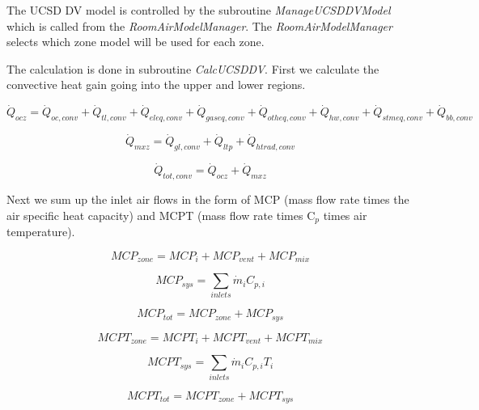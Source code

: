 The UCSD DV model is controlled by the subroutine \emph{ManageUCSDDVModel} which is called from the \emph{RoomAirModelManager}. The \emph{RoomAirModelManager} selects which zone model will be used for each zone.

The calculation is done in subroutine \emph{CalcUCSDDV}. First we calculate the convective heat gain going into the upper and lower regions.

\begin{equation}
\dot Q_{ocz} = \dot Q_{oc,conv} + \dot Q_{tl,conv} + \dot Q_{eleq,conv} + \dot Q_{gaseq,conv} + \dot Q_{otheq,conv} + \dot Q_{hw,conv} + \dot Q_{stmeq,conv} + \dot Q_{bb,conv}
\end{equation}

\begin{equation}
{\dot Q_{mxz}} = {\dot Q_{gl,conv}} + {\dot Q_{ltp}} + {\dot Q_{htrad,conv}}
\end{equation}

\begin{equation}
{\dot Q_{tot,conv}} = {\dot Q_{ocz}} + {\dot Q_{mxz}}
\end{equation}

Next we sum up the inlet air flows in the form of MCP (mass flow rate times the air specific heat capacity) and MCPT (mass flow rate times C\(_{p}\) times air temperature).

\begin{equation}
MC{P_{zone}} = MC{P_i} + MC{P_{vent}} + MC{P_{mix}}
\end{equation}

\begin{equation}
MC{P_{sys}} = \sum\limits_{inlets} {{{\dot m}_i}} {C_{p,i}}
\end{equation}

\begin{equation}
MC{P_{tot}} = MC{P_{zone}} + MC{P_{sys}}
\end{equation}

\begin{equation}
MCP{T_{zone}} = MCP{T_i} + MCP{T_{vent}} + MCP{T_{mix}}
\end{equation}

\begin{equation}
MCP{T_{sys}} = \sum\limits_{inlets} {{{\dot m}_i}} {C_{p,i}}{T_i}
\end{equation}

\begin{equation}
MCP{T_{tot}} = MCP{T_{zone}} + MCP{T_{sys}}
\end{equation}

